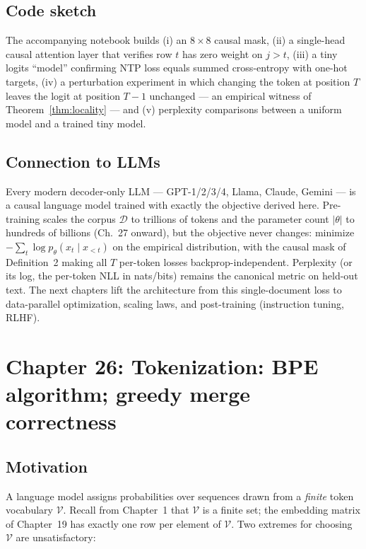 \documentclass[11pt]{article}
\theoremstyle{remark}
\begin{document}
\subsection*{Code sketch}

The accompanying notebook builds (i) an $8\times 8$ causal mask, (ii) a single-head causal attention layer that verifies row $t$ has zero weight on $j>t$, (iii) a tiny logits ``model'' confirming NTP loss equals summed cross-entropy with one-hot targets, (iv) a perturbation experiment in which changing the token at position $T$ leaves the logit at position $T-1$ unchanged --- an empirical witness of Theorem~\ref{thm:locality} --- and (v) perplexity comparisons between a uniform model and a trained tiny model.

\subsection*{Connection to LLMs}

Every modern decoder-only LLM --- GPT-1/2/3/4, Llama, Claude, Gemini --- is a causal language model trained with exactly the objective derived here. Pre-training scales the corpus $\mathcal{D}$ to trillions of tokens and the parameter count $|\theta|$ to hundreds of billions (Ch.~27 onward), but the objective never changes: minimize $-\sum_t \log p_\theta(x_t\mid x_{<t})$ on the empirical distribution, with the causal mask of Definition~2 making all $T$ per-token losses backprop-independent. Perplexity (or its log, the per-token NLL in nats/bits) remains the canonical metric on held-out text. The next chapters lift the architecture from this single-document loss to data-parallel optimization, scaling laws, and post-training (instruction tuning, RLHF).


\section*{Chapter 26: Tokenization: BPE algorithm; greedy merge correctness}

\subsection*{Motivation}

A language model assigns probabilities over sequences drawn from a \emph{finite} token vocabulary $\mathcal{V}$. Recall from Chapter~1 that $\mathcal{V}$ is a finite set; the embedding matrix of Chapter~19 has exactly one row per element of $\mathcal{V}$. Two extremes for choosing $\mathcal{V}$ are unsatisfactory:
\end{document}
